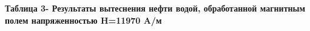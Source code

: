 {{%

{\bfseries Таблица 3- Результаты вытеснения нефти водой, обработанной
магнитным полем напряженностью H=11970 A/м}

}}
